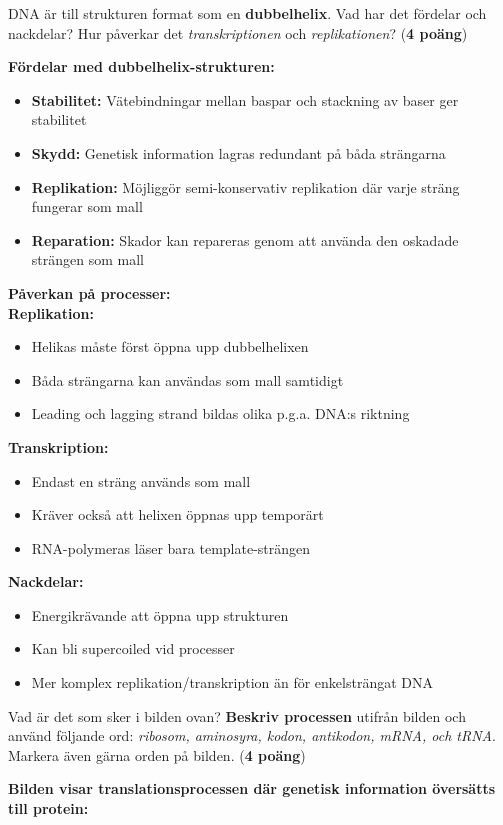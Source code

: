 \documentclass{exam}
\begin{document}
\begin{questions}
\question DNA är till strukturen format som en \textbf{dubbelhelix}. Vad har det fördelar och nackdelar? Hur påverkar det \textit{transkriptionen} och \textit{replikationen}? (\textbf{4 poäng})
\begin{solution}
\textbf{Fördelar med dubbelhelix-strukturen:}
\begin{itemize}
    \item \textbf{Stabilitet:} Vätebindningar mellan baspar och stackning av baser ger stabilitet
    \item \textbf{Skydd:} Genetisk information lagras redundant på båda strängarna
    \item \textbf{Replikation:} Möjliggör semi-konservativ replikation där varje sträng fungerar som mall
    \item \textbf{Reparation:} Skador kan repareras genom att använda den oskadade strängen som mall
\end{itemize}

\textbf{Påverkan på processer:}\\
\textbf{Replikation:}
\begin{itemize}
    \item Helikas måste först öppna upp dubbelhelixen
    \item Båda strängarna kan användas som mall samtidigt
    \item Leading och lagging strand bildas olika p.g.a. DNA:s riktning
\end{itemize}

\textbf{Transkription:}
\begin{itemize}
    \item Endast en sträng används som mall
    \item Kräver också att helixen öppnas upp temporärt
    \item RNA-polymeras läser bara template-strängen
\end{itemize}

\textbf{Nackdelar:}
\begin{itemize}
    \item Energikrävande att öppna upp strukturen
    \item Kan bli supercoiled vid processer
    \item Mer komplex replikation/transkription än för enkelsträngat DNA
\end{itemize}
\end{solution}

\newpage

\question 
Vad är det som sker i bilden ovan? \textbf{Beskriv processen} utifrån bilden och använd följande ord: \textit{ribosom, aminosyra, kodon, antikodon, mRNA, och tRNA}. Markera även gärna orden på bilden. (\textbf{4 poäng})
\begin{solution}
\textbf{Bilden visar translationsprocessen där genetisk information översätts till protein:}


\end{solution}
\end{questions}
\end{document}
